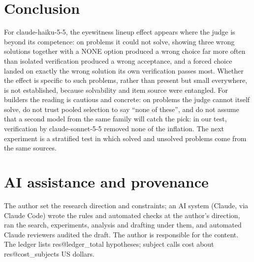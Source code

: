 \documentclass[10pt,twocolumn]{article}
\makeatletter
\newcommand{\res}[1]{\csname res@#1\endcsname}
\makeatother
\begin{document}
\section{Conclusion}
For claude-haiku-5-5, the eyewitness lineup effect appears where the judge is beyond its competence: on problems it could not solve, showing three wrong solutions together with a NONE option produced a wrong choice far more often than isolated verification produced a wrong acceptance, and a forced choice landed on exactly the wrong solution its own verification passes most. Whether the effect is specific to such problems, rather than present but small everywhere, is not established, because solvability and item source were entangled. For builders the reading is cautious and concrete: on problems the judge cannot itself solve, do not trust pooled selection to say ``none of these'', and do not assume that a second model from the same family will catch the pick: in our test, verification by claude-sonnet-5-5 removed none of the inflation. The next experiment is a stratified test in which solved and unsolved problems come from the same sources.

\section*{AI assistance and provenance}
The author set the research direction and constraints; an AI system (Claude, via Claude Code) wrote the rules and automated checks at the author's direction, ran the search, experiments, analysis and drafting under them, and automated Claude reviewers audited the draft. The author is responsible for the content. The ledger lists \res{ledger_total} hypotheses; subject calls cost about \res{cost_subjects} US dollars.



\end{document}
